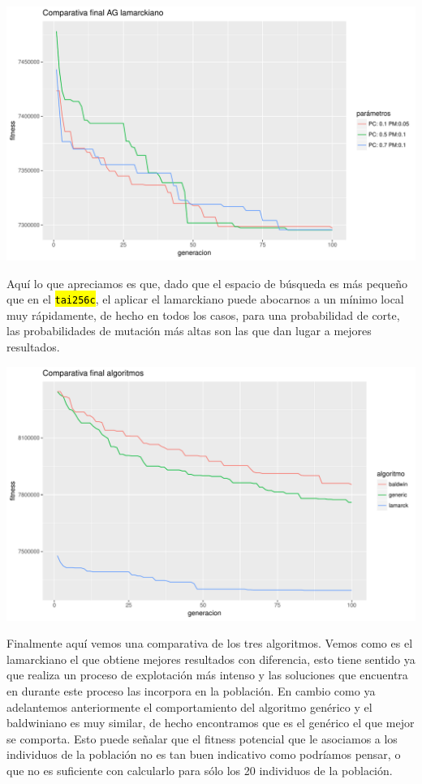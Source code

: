 \documentclass[10pt,a4paper]{article}
\newcommand{\code}[1]{\sethlcolor{light-gray}\hl{\texttt{#1}}} %
\begin{document}
\includegraphics[width = \textwidth]{img/graphics/GAlamarckFinal.pdf}

Aquí lo que apreciamos es que, dado que el espacio de búsqueda es más pequeño que en el \code{tai256c}, el aplicar el lamarckiano puede abocarnos a un mínimo local muy rápidamente, de hecho en todos los casos, para una probabilidad de corte, las probabilidades de mutación más altas son las que dan lugar a mejores resultados.

\includegraphics[width = \textwidth]{img/graphics/final.pdf}

Finalmente aquí vemos una comparativa de los tres algoritmos. Vemos como es el lamarckiano el que obtiene mejores resultados con diferencia, esto tiene sentido ya que realiza un proceso de explotación más intenso y las soluciones que encuentra en durante este proceso las incorpora en la población. En cambio como ya adelantemos anteriormente el comportamiento del algoritmo genérico y el baldwiniano es muy similar, de hecho encontramos que es el genérico el que mejor se comporta. Esto puede señalar que el fitness potencial que le asociamos a los individuos de la población no es tan buen indicativo como podríamos pensar, o que no es suficiente con calcularlo para sólo los 20 individuos de la población.
\end{document}
